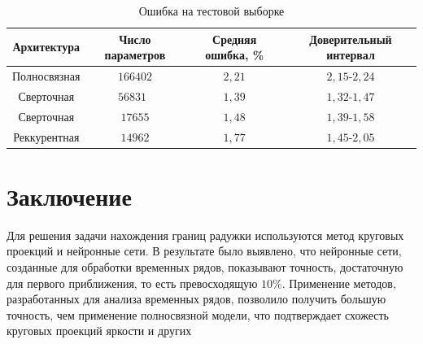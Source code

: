 \documentclass[12pt, twoside]{article}
\begin{document}
\begin{table}
\caption{Ошибка на тестовой выборке}
\label{table:error}
\begin{tabular}{c c c c}
\hline
Архитектура & Число \mbox{параметров} & Средняя ошибка, \% & Доверительный интервал\tabularnewline
\hline
Полносвязная & $166402$ & $2,21$ & $2,15$-$2,24$\tabularnewline
Сверточная & $56831$\ & $1,39$ & $1,32$-$1,47$\tabularnewline
Сверточная & $17655$ & $1,48$ & $1,39$-$1,58$\tabularnewline
Реккурентная & $14962$ & $1,77$ & $1,45$-$2,05$\tabularnewline
\hline
\end{tabular}
\end{table}


\section{Заключение}
Для решения задачи нахождения границ радужки используются метод круговых проекций и нейронные сети. В результате было выявлено, что нейронные сети, созданные для обработки временных рядов, показывают точность, достаточную для первого приближения, то есть превосходящую $10\%$. Применение методов, разработанных для анализа временных рядов, позволило получить большую точность, чем применение полносвязной модели, что подтверждает схожесть круговых проекций яркости и других
\end{document}
